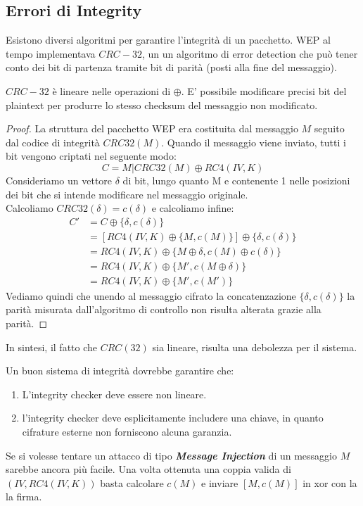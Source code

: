 \subsection{Errori di Integrity}
Esistono diversi algoritmi per garantire l'integrità di un pacchetto. WEP al tempo implementava $CRC-32$, un un algoritmo di error detection che può tener conto dei bit di partenza tramite bit di parità (posti alla fine del messaggio).
\begin{theorem}
$CRC-32$ è lineare nelle operazioni di $\oplus$. E' possibile modificare precisi bit del plaintext per produrre lo stesso checksum del messaggio non modificato.
\end{theorem}
\begin{proof}
La struttura del pacchetto WEP era costituita dal messaggio $M$ seguito dal codice di integrità $CRC32(M)$. Quando il messaggio viene inviato, tutti i bit vengono criptati nel seguente modo:
\[
C= M|CRC32(M)\oplus{RC4(IV, K)}
\]
Consideriamo un vettore $\delta$ di bit, lungo quanto M e contenente 1 nelle posizioni dei bit che si intende modificare nel messaggio originale.\\
Calcoliamo $CRC32(\delta)=c(\delta)$ e calcoliamo infine:
\begin{equation*}
    \begin{aligned}
    C'&=C\oplus\{\delta,c(\delta)\}\\
    &=[RC4(IV,K)\oplus{\{M,c(M)\}}]\oplus\{\delta,c(\delta)\}\\
    &=RC4(IV,K)\oplus\{M\oplus{\delta},c(M)\oplus{c(\delta)}\}\\
    &=RC4(IV,K)\oplus\{M',c(M\oplus{\delta})\}\\
    &=RC4(IV,K)\oplus\{M',c(M')\}
    \end{aligned}
\end{equation*}
Vediamo quindi che unendo al messaggio cifrato la concatenzazione $\{\delta,c(\delta)\}$ la parità misurata dall'algoritmo di controllo non risulta alterata grazie alla parità.
\end{proof}
\begin{remark}
In sintesi, il fatto che $CRC(32)$ sia lineare, risulta una debolezza per il sistema.
\end{remark}
\begin{proposition}
Un buon sistema di integrità dovrebbe garantire che:
\begin{enumerate}
    \item L'integrity checker deve essere non lineare.
    \item l'integrity checker deve esplicitamente includere una chiave, in quanto cifrature esterne non forniscono alcuna garanzia.
\end{enumerate}
\end{proposition}
\begin{remark}
Se si volesse tentare un attacco di tipo \textbf{\textit{Message Injection}} di un messaggio $M$ sarebbe ancora più facile. Una volta ottenuta una coppia valida di $(IV,RC4(IV,K))$ basta calcolare $c(M)$ e inviare $[M,c(M)]$ in xor con la la firma.
\end{remark}